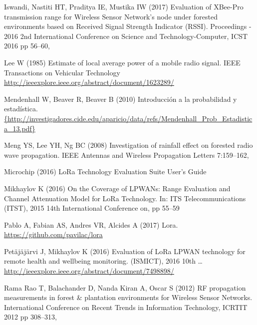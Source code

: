 \begin{thebibliography}{19}
Iswandi, Nastiti HT, Praditya IE, Mustika IW (2017) {Evaluation of XBee-Pro
  transmission range for Wireless Sensor Network's node under forested
  environments based on Received Signal Strength Indicator (RSSI)}. Proceedings
  - 2016 2nd International Conference on Science and Technology-Computer, ICST
  2016 pp 56--60, 

Lee W (1985) {Estimate of local average power of a mobile radio signal}. IEEE
  Transactions on Vehicular Technology
  \urlprefix\url{http://ieeexplore.ieee.org/abstract/document/1623289/}

Mendenhall W, Beaver R, Beaver B (2010) {Introducci{\'{o}}n a la probabilidad y
  estad{\'{i}}stica}.
  \urlprefix\url{{http://investigadores.cide.edu/aparicio/data/refs/Mendenhall_Prob_Estadistica_13.pdf}}

Meng YS, Lee YH, Ng BC (2008) {Investigation of rainfall effect on forested
  radio wave propagation}. IEEE Antennas and Wireless Propagation Letters
  7:159--162, 

Microchip (2016) {LoRa Technology Evaluation Suite User's Guide}

Mikhaylov K (2016) {On the Coverage of LPWANs: Range Evaluation and Channel
  Attenuation Model for LoRa Technology}. In: {ITS Telecommunications (ITST),
  2015 14th International Conference on}, pp 55--59

Pablo A, Fabian AS, Andres VR, Alcides A (2017) Lora.
  \url{https://github.com/pavilac/lora}

Pet{\"{a}}j{\"{a}}j{\"{a}}rvi J, Mikhaylov K (2016) {Evaluation of LoRa LPWAN
  technology for remote health and wellbeing monitoring}. (ISMICT), 2016 10th
  {\ldots}
  \urlprefix\url{http://ieeexplore.ieee.org/abstract/document/7498898/}

{Rama Rao} T, Balachander D, {Nanda Kiran} A, Oscar S (2012) {RF propagation
  measurements in forest {\&} plantation environments for Wireless Sensor
  Networks}. International Conference on Recent Trends in Information
  Technology, ICRTIT 2012 pp 308--313, 


\end{thebibliography}
